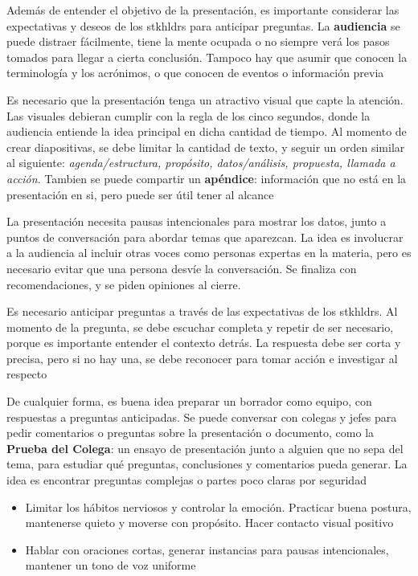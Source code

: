 Además de entender el objetivo de la presentación, es importante considerar las expectativas y deseos de los \gls{stkhldrs} para anticipar preguntas. La \textbf{audiencia} se puede distraer fácilmente, tiene la mente ocupada o no siempre verá los pasos tomados para llegar a cierta conclusión. Tampoco hay que asumir que conocen la terminología y los acrónimos, o que conocen de eventos o información previa 

Es necesario que la presentación tenga un atractivo visual que capte la atención. Las visuales debieran cumplir con la regla de los cinco segundos, donde la audiencia entiende la idea principal en dicha cantidad de tiempo. Al momento de crear diapositivas, se debe limitar la cantidad de texto, y seguir un orden similar al siguiente: \textit{agenda/estructura, propósito, datos/análisis, propuesta, llamada a acción}. Tambien se puede compartir un \textbf{apéndice}: información que no está en la presentación en si, pero puede ser útil tener al alcance

La presentación necesita pausas intencionales para mostrar los datos, junto a puntos de conversación para abordar temas que aparezcan. La idea es involucrar a la audiencia al incluir otras voces como personas expertas en la materia, pero es necesario evitar que una persona desvíe la conversación. Se finaliza con recomendaciones, y se piden opiniones al cierre. 

Es necesario anticipar preguntas a través de las expectativas de los \gls{stkhldrs}. Al momento de la pregunta, se debe escuchar completa y repetir de ser necesario, porque es importante entender el contexto detrás. La respuesta debe ser corta y precisa, pero si no hay una, se debe reconocer para tomar acción e investigar al respecto

De cualquier forma, es buena idea preparar un borrador como equipo, con respuestas a preguntas anticipadas. Se puede conversar con colegas y jefes para pedir comentarios o preguntas sobre la presentación o documento, como la \textbf{Prueba del Colega}: un ensayo de presentación junto a alguien que no sepa del tema, para estudiar qué preguntas, conclusiones y comentarios pueda generar. La idea es encontrar preguntas complejas o partes poco claras por seguridad




\begin{itemize}
    \item {Limitar los hábitos nerviosos y controlar la emoción. Practicar buena postura, mantenerse quieto y moverse con propósito. Hacer contacto visual positivo}
    \item {Hablar con oraciones cortas, generar instancias para pausas intencionales, mantener un tono de voz uniforme}
\end{itemize}

